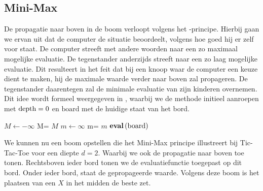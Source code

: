 \subsection{Mini-Max}
De propagatie naar boven in de boom verloopt volgens het -principe. Hierbij gaan we ervan uit dat de computer de situatie beoordeelt, volgens hoe goed hij er zelf voor staat. De computer streeft met andere woorden naar een zo maximaal mogelijke evaluatie. De tegenstander anderzijds streeft naar een zo laag mogelijke evaluatie. Dit resulteert in het feit dat bij een knoop waar de computer een keuze dient te maken, hij de maximale waarde verder naar boven zal propageren. De tegenstander daarentegen zal de minimale evaluatie van zijn kinderen overnemen. Dit idee wordt formeel weergegeven in , waarbij we de methode initieel aanroepen met $\mbox{depth}=0$ en $\mbox{board}$ met de huidige staat van het bord.
\begin{algorithm}[htb]                      %
\caption{$\mathcommand{minimax}{\mbox{board},\depth}$}          %
\label{alg:minimax}                           %
\begin{algorithmic}[1]                    %
\IF{$\depth<\depthbound$}
\STATE{}
\STATE$M\leftarrow-\infty$
\STATE M=
\ENDFOR
\RETURN $M$
\ELSE
\STATE$m\leftarrow\infty$
\STATE m=
\ENDFOR
\RETURN $m$
\ENDIF
\ELSE
\STATE{}
\RETURN $\mbox{\bf eval}\left( \mbox{board} \right)$
\ENDIF
\end{algorithmic}
\end{algorithm}
\begin{leftbar}
We kunnen nu een boom opstellen die het Mini-Max principe illustreert bij Tic-Tac-Toe voor een diepte $d=2$. Waarbij we ook de propagatie naar boven toe tonen. Rechtsboven ieder bord tonen we de evaluatiefunctie toegepast op dit bord. Onder ieder bord, staat de gepropageerde waarde. Volgens deze boom is het plaatsen van een $X$ in het midden de beste zet.
\end{leftbar}
